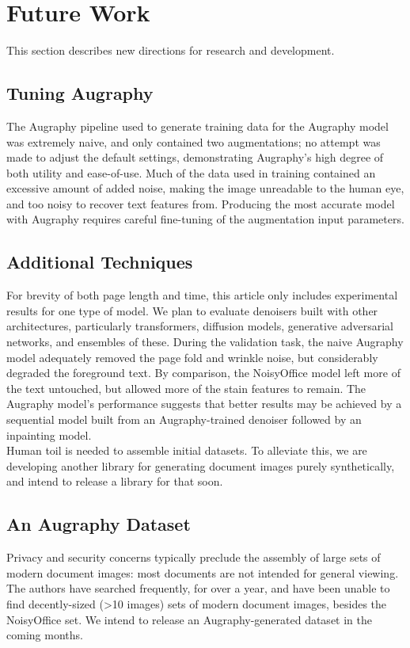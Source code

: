 \documentclass[runningheads]{llncs}
\begin{document}
\section{Future Work}
This section describes new directions for research and development.

\subsection{Tuning Augraphy}
The Augraphy pipeline used to generate training data for the Augraphy model was extremely naive, and only contained two augmentations; no attempt was made to adjust the default settings, demonstrating Augraphy's high degree of both utility and ease-of-use. Much of the data used in training contained an excessive amount of added noise, making the image unreadable to the human eye, and too noisy to recover text features from. Producing the most accurate model with Augraphy requires careful fine-tuning of the augmentation input parameters.

\subsection{Additional Techniques}
For brevity of both page length and time, this article only includes experimental results for one type of model. We plan to evaluate denoisers built with other architectures, particularly transformers, diffusion models, generative adversarial networks, and ensembles of these. During the validation task, the naive Augraphy model adequately removed the page fold and wrinkle noise, but considerably degraded the foreground text. By comparison, the NoisyOffice model left more of the text untouched, but allowed more of the stain features to remain. The Augraphy model's performance suggests that better results may be achieved by a sequential model built from an Augraphy-trained denoiser followed by an inpainting model.\\

Human toil is needed to assemble initial datasets. To alleviate this, we are developing another library for generating document images purely synthetically, and intend to release a library for that soon.

\subsection{An Augraphy Dataset}
Privacy and security concerns typically preclude the assembly of large sets of modern document images: most documents are not intended for general viewing. The authors have searched frequently, for over a year, and have been unable to find decently-sized (>10 images) sets of modern document images, besides the NoisyOffice set. We intend to release an Augraphy-generated dataset in the coming months.
\end{document}
